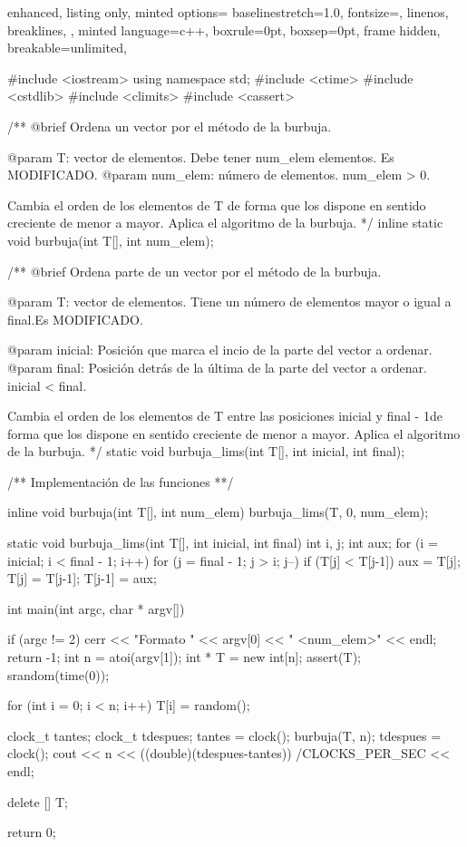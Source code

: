 \documentclass[12pt,spanish]{article}
\begin{document}
\begin{multicols}{2}
\begin{tcblisting}
{
  enhanced,
  listing only,
  minted options={
    baselinestretch=1.0,
    fontsize=\footnotesize,
    linenos,
    breaklines,
  },
  minted language=c++,
  boxrule=0pt,
  boxsep=0pt,
  frame hidden,
  breakable=unlimited,
}

#include <iostream>
using namespace std;
#include <ctime>
#include <cstdlib>
#include <climits>
#include <cassert>

/**
   @brief Ordena un vector por el método de la burbuja.

   @param T: vector de elementos. Debe tener num_elem elementos.
             Es MODIFICADO.
   @param num_elem: número de elementos. num_elem > 0.

   Cambia el orden de los elementos de T de forma que los dispone
   en sentido creciente de menor a mayor.
   Aplica el algoritmo de la burbuja.
*/
inline static 
void burbuja(int T[], int num_elem);

/**
   @brief Ordena parte de un vector por el método de la burbuja.

   @param T: vector de elementos. Tiene un número de elementos 
                   mayor o igual a final.Es MODIFICADO.

   @param inicial: Posición que marca el incio de la parte del
                   vector a ordenar.
   @param final: Posición detrás de la última de la parte del
                   vector a ordenar. 
		   inicial < final.

   Cambia el orden de los elementos de T entre las posiciones
   inicial y final - 1de forma que los dispone en sentido creciente
   de menor a mayor.
   Aplica el algoritmo de la burbuja.
*/
static void burbuja_lims(int T[], int inicial, int final);

/**
   Implementación de las funciones
**/

inline void burbuja(int T[], int num_elem)
{
  burbuja_lims(T, 0, num_elem);
}

static void burbuja_lims(int T[], int inicial, int final)
{
  int i, j;
  int aux;
  for (i = inicial; i < final - 1; i++)
    for (j = final - 1; j > i; j--)
      if (T[j] < T[j-1])
	{
	  aux = T[j];
	  T[j] = T[j-1];
	  T[j-1] = aux;
	}
}

int main(int argc, char * argv[]){
    if (argc != 2){
      cerr << "Formato " << argv[0] << " <num_elem>" << endl;
      return -1;
    }
  int n = atoi(argv[1]);
  int * T = new int[n];
  assert(T);
  srandom(time(0));

  for (int i = 0; i < n; i++)
      T[i] = random();

  clock_t tantes;  
  clock_t tdespues; 
  tantes = clock();
  burbuja(T, n);
  tdespues = clock();
  cout << n  << 
  ((double)(tdespues-tantes))
  /CLOCKS_PER_SEC << endl;
  
  delete [] T;

  return 0;
}
\end{tcblisting}
\end{multicols}
\newpage
\end{document}
